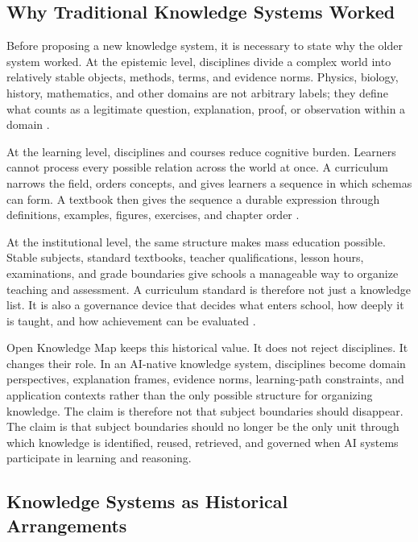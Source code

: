 \documentclass[11pt,letterpaper]{article}
\newcommand{\OKM}{Open Knowledge Map}
\begin{document}
\subsection{Why Traditional Knowledge Systems Worked}

Before proposing a new knowledge system, it is necessary to state why the older system worked. At the epistemic level, disciplines divide a complex world into relatively stable objects, methods, terms, and evidence norms. Physics, biology, history, mathematics, and other domains are not arbitrary labels; they define what counts as a legitimate question, explanation, proof, or observation within a domain \cite{bernstein-classification}.

At the learning level, disciplines and courses reduce cognitive burden. Learners cannot process every possible relation across the world at once. A curriculum narrows the field, orders concepts, and gives learners a sequence in which schemas can form. A textbook then gives the sequence a durable expression through definitions, examples, figures, exercises, and chapter order \cite{sweller,anderson-krathwohl,merrill}.

At the institutional level, the same structure makes mass education possible. Stable subjects, standard textbooks, teacher qualifications, lesson hours, examinations, and grade boundaries give schools a manageable way to organize teaching and assessment. A curriculum standard is therefore not just a knowledge list. It is also a governance device that decides what enters school, how deeply it is taught, and how achievement can be evaluated \cite{soysal-strang-mass-education,bernstein-classification}.

\OKM{} keeps this historical value. It does not reject disciplines. It changes their role. In an AI-native knowledge system, disciplines become domain perspectives, explanation frames, evidence norms, learning-path constraints, and application contexts rather than the only possible structure for organizing knowledge. The claim is therefore not that subject boundaries should disappear. The claim is that subject boundaries should no longer be the only unit through which knowledge is identified, reused, retrieved, and governed when AI systems participate in learning and reasoning.

\subsection{Knowledge Systems as Historical Arrangements}
\end{document}

